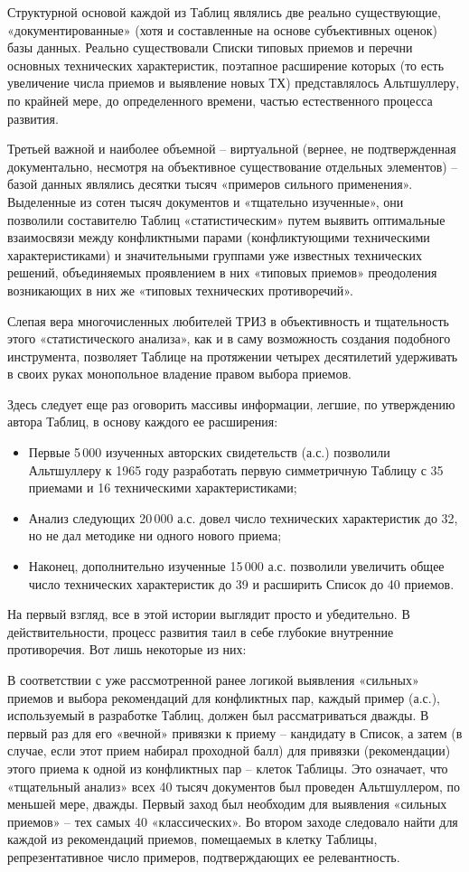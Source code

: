 \documentclass[11pt,a4paper]{article}
\begin{document}
Структурной основой каждой из Таблиц являлись две реально существующие,
«документированные» (хотя и составленные на основе субъективных оценок) базы
данных. Реально существовали Списки типовых приемов и перечни основных
технических характеристик, поэтапное расширение которых (то есть увеличение
числа приемов и выявление новых ТХ) представлялось Альтшуллеру, по крайней
мере, до определенного времени, частью естественного процесса развития.

Третьей важной и наиболее объемной -- виртуальной (вернее, не подтвержденная
документально, несмотря на объективное существование отдельных элементов) --
базой данных являлись десятки тысяч «примеров сильного применения». Выделенные
из сотен тысяч документов и «тщательно изученные», они позволили составителю
Таблиц «статистическим» путем выявить оптимальные взаимосвязи между
конфликтными парами (конфликтующими техническими характеристиками) и
значительными группами уже известных технических решений, объединяемых
проявлением в них «типовых приемов» преодоления возникающих в них же «типовых
технических противоречий».

Слепая вера многочисленных любителей ТРИЗ в объективность и тщательность этого
«статистического анализа», как и в саму возможность создания подобного
инструмента, позволяет Таблице на протяжении четырех десятилетий удерживать в
своих руках монопольное владение правом выбора приемов.

Здесь следует еще раз оговорить массивы информации, легшие, по утверждению
автора Таблиц, в основу каждого ее расширения:
\begin{itemize}
\item Первые 5\,000 изученных авторских свидетельств (а.с.) позволили
  Альтшуллеру к 1965 году разработать первую симметричную Таблицу с 35
  приемами и 16 техническими характеристиками;
\item Анализ следующих 20\,000 а.с. довел число технических характеристик до
  32, но не дал методике ни одного нового приема;
\item Наконец, дополнительно изученные 15\,000 а.с. позволили увеличить общее
  число технических характеристик до 39 и расширить Список до 40 приемов.
\end{itemize}
На первый взгляд, все в этой истории выглядит просто и убедительно. В
действительности, процесс развития таил в себе глубокие внутренние
противоречия.  Вот лишь некоторые из них:

В соответствии с уже рассмотренной ранее логикой выявления «сильных» приемов и
выбора рекомендаций для конфликтных пар, каждый пример (а.с.), используемый в
разработке Таблиц, должен был рассматриваться дважды. В первый раз для его
«вечной» привязки к приему -- кандидату в Список, а затем (в случае, если этот
прием набирал проходной балл) для привязки (рекомендации) этого приема к одной
из конфликтных пар -- клеток Таблицы. Это означает, что «тщательный анализ»
всех 40 тысяч документов был проведен Альтшуллером, по меньшей мере, дважды.
Первый заход был необходим для выявления «сильных приемов» -- тех самых 40
«классических». Во втором заходе следовало найти для каждой из рекомендаций
приемов, помещаемых в клетку Таблицы, репрезентативное число примеров,
подтверждающих ее релевантность.
\end{document}
